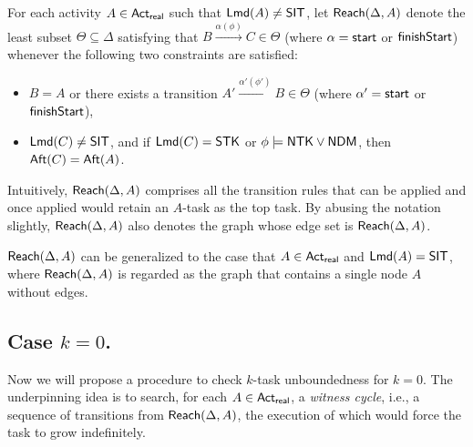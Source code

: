 % 
%
%
For each activity $A \in {\sf Act}_{\sf real}$ such that ${\sf Lmd}(A) \neq {\sf SIT}$, let ${\sf Reach}(\Delta, A)$ denote the least subset $\Theta\subseteq \Delta$ satisfying that %
$B \xrightarrow{\alpha(\phi)} C \in \Theta$ (where $\alpha = {\mathsf{start} }$ or ${\mathsf{finishStart} }$) 
whenever the following two constraints are satisfied: 
\begin{itemize}
\item $B = A$ or there exists a transition $A' \xrightarrow{\alpha'(\phi')} B \in \Theta$ (where $\alpha' = {\mathsf{start} }$ or ${\mathsf{finishStart} }$),
%
\item ${\sf Lmd}(C) \neq {\sf SIT}$, and if ${\sf Lmd}(C) = {\sf STK}$ or $\phi \models {\sf NTK}\vee{\sf NDM}$, then ${\sf Aft}(C) = {\sf Aft}(A)$.
\end{itemize}
Intuitively, ${\sf Reach}(\Delta, A)$ comprises all the transition rules that can be applied and once applied would  retain an $A$-task as the top task. 
%
By abusing the notation slightly, ${\sf Reach}(\Delta, A)$ also denotes the graph whose edge set is ${\sf Reach}(\Delta, A)$.

${\sf Reach}(\Delta, A)$ can be generalized to the case that $A \in {\sf Act}_{\sf real}$ and ${\sf Lmd}(A) = {\sf SIT}$, where ${\sf Reach}(\Delta, A)$ is regarded as the graph that contains a single node $A$ without edges.


%
\subsection*{Case $k = 0$.}
Now we will propose a procedure to check $k$-task unboundedness for $k=0$. The underpinning idea is  to search, for each $A \in {\sf Act}_{\sf real}$,  %
a \emph{witness cycle}, i.e., a sequence of transitions  from ${\sf Reach}(\Delta, A)$, the execution of which would force the task to grow indefinitely. %


